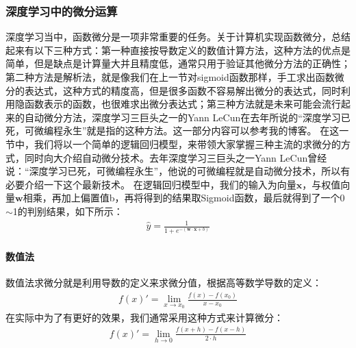 \documentclass[UTF8]{article}
\begin{document}
\subsubsection{深度学习中的微分运算}
深度学习当中，函数微分是一项非常重要的任务。关于计算机实现函数微分，总结起来有以下三种方式：第一种直接按导数定义的数值计算方法，这种方法的优点是简单，但是缺点是计算量大并且精度低，通常只用于验证其他微分方法的正确性；第二种方法是解析法，就是像我们在上一节对sigmoid函数那样，手工求出函数微分的表达式，这种方式的精度高，但是很多函数不容易解出微分的表达式，同时利用隐函数表示的函数，也很难求出微分表达式；第三种方法就是未来可能会流行起来的自动微分方法，深度学习三巨头之一的Yann LeCun在去年所说的“深度学习已死，可微编程永生”就是指的这种方法。这一部分内容可以参考我的博客\cite{r000004}。\newline
在这一节中，我们将以一个简单的逻辑回归模型，来带领大家掌握三种主流的求微分的方式，同时向大介绍自动微分技术。去年深度学习三巨头之一Yann LeCun曾经说：“深度学习已死，可微编程永生”，他说的可微编程就是自动微分技术，所以有必要介绍一下这个最新技术。\newline
在逻辑回归模型中，我们的输入为向量$\boldsymbol{x}$，与权值向量$\boldsymbol{w}$相乘，再加上偏置值b，再将得到的结果取Sigmoid函数，最后就得到了一个0$\sim$1的判别结果，如下所示：
\begin{equation}
\begin{aligned}
\hat{y}=\frac{1}{1+e^{-(\boldsymbol{w}\cdot \boldsymbol{x} + b)}}
\end{aligned}
\label{mlp-lcrn-output-forward}
\end{equation}
\paragraph{数值法}
数值法求微分就是利用导数的定义来求微分值，根据高等数学导数的定义：
\begin{equation}
\begin{aligned}
f(x)'=\lim_{x \to x_0}\frac{f(x)-f(x_0)}{x-x_0}
\end{aligned}
\label{mlp-math-devirative-def}
\end{equation}
在实际中为了有更好的效果，我们通常采用这种方式来计算微分：
\begin{equation}
\begin{aligned}
f(x)'=\lim_{h \to 0}\frac{f(x+h) - f(x-h)}{2 \cdot h}
\end{aligned}
\label{mlp-math-devirative-def-fine}
\end{equation}
\end{document}
